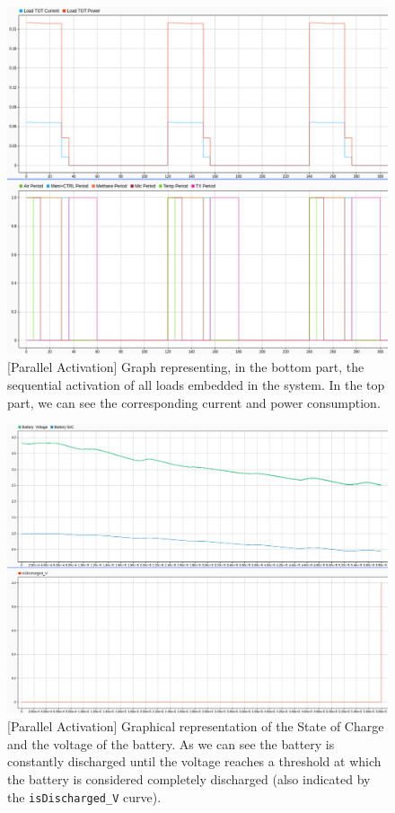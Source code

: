 \documentclass[a4paper]{article}
\begin{document}
        \begin{figure}[htp]
            \centering
            \includegraphics[width=1 \columnwidth]{./screenshots/ParActiv/2Minutes/ParLoadAndTOTPowerCurrent.png}
            \caption{
                    \label{fig:ParLoadAndTOTPowerCurrent}
                    [Parallel Activation] Graph representing, in the bottom part, the sequential activation of all loads embedded in the system. In the top part, we can see the corresponding current and power consumption.
            }
        \end{figure}

        \begin{figure}[htp]
            \centering
            \includegraphics[width=0.8 \columnwidth]{./screenshots/ParActiv/2Minutes/BattV-BattSoC-isDischargedV.png}
            \caption{
                    \label{fig:ParBattV-BattSoC-isDischargedV}
                    [Parallel Activation] Graphical representation of the State of Charge and the voltage of the battery. As we can see the battery is constantly discharged until the voltage reaches a threshold at which the battery is considered completely discharged (also indicated by the \texttt{isDischarged\_V} curve).
            }
        \end{figure}
\end{document}
